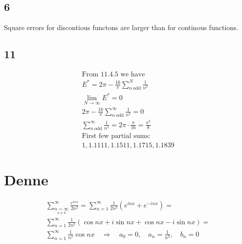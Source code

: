\subsection*{6}


Square errors for discontious functons are larger than for continous functions.


\subsection*{11}


\begin{gather*}
	\text{From 11.4.5 we have} 
	\\
	E^* = 2 \pi - \frac{16}{\pi} \sum_{n\ \text{odd}}^N{\frac{1}{n^2}}
	\\
	\lim_{N \rightarrow \infty}{E^*} = 0
	\\
	2 \pi - \frac{16}{\pi} \sum_{n\ \text{odd}}^\infty{\frac{1}{n^2}} = 0
	\\
	\sum_{n\ \text{odd}}^\infty{\frac{1}{n^2}} = 2 \pi \cdot \frac{\pi}{16} = \frac{\pi^2}{8}
	\\
	\text{First few partial sums: }
	\\
	1, 1.1111, 1.1511, 1.1715, 1.1839
\end{gather*}


\section*{Denne}


\begin{gather*}
	\sum_{\underset{n\neq 0}{n = \infty}}^\infty{\frac{e^{i n x}}{2 n^2}} =
	\sum_{n = 1}^\infty{\frac{1}{2 n^2} \left(
		e^{i n x} + e^{- i n x}
	\right)} =
	\\
	\sum_{n = 1}^\infty{\frac{1}{2 n^2} \left(
		\cos{n x} + i \sin{n x} + \cos{n x} - i \sin{n x}
	\right)} =
	\\
	\sum_{n = 1}^\infty{\frac{1}{n^2} \cos{n x}} \quad \Rightarrow \quad
	a_0 = 0, \quad a_n = \frac{1}{n^2}, \quad b_n = 0
\end{gather*}
